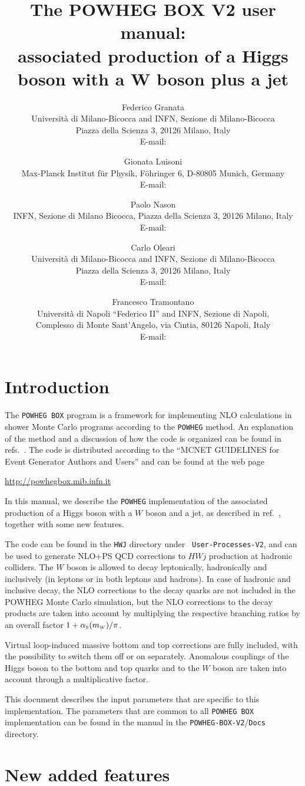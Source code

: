 \documentclass[paper]{JHEP3}
\title{The POWHEG BOX V2 user manual:\\
  associated production of a Higgs boson with a $\boldsymbol{W}$ boson plus a jet} \vfill
\author{Federico Granata\\
  Universit\`a di Milano-Bicocca and INFN, Sezione di Milano-Bicocca\\
  Piazza della Scienza 3, 20126 Milano, Italy\\
  E-mail: \email{federico.granata@mib.infn.it}}
\author{Gionata Luisoni\\ 
  Max-Planck Institut f{\"u}r Physik, F\"ohringer 6, D-80805 Munich, Germany\\
  E-mail: \email{luisonig@mpp.mpg.de}
}
\author{Paolo Nason\\
  INFN, Sezione di Milano Bicocca, Piazza della Scienza 3, 20126 Milano, Italy\\
  E-mail: \email{paolo.nason@mib.infn.it}
}
\author{Carlo Oleari\\
  Universit\`a di Milano-Bicocca and INFN, Sezione di Milano-Bicocca\\
  Piazza della Scienza 3, 20126 Milano, Italy\\
  E-mail: \email{carlo.oleari@mib.infn.it}}
\author{Francesco Tramontano\\
  Universit\`a di Napoli ``Federico II'' and INFN, Sezione di Napoli,\\
  Complesso di Monte Sant'Angelo, via Cintia, 80126 Napoli, Italy\\
  E-mail: \email{francesco.tramontano@na.infn.it}
}
\newcommand\sss{\mathchoice%
{\displaystyle}%
{\scriptstyle}%
{\scriptscriptstyle}%
{\scriptscriptstyle}%
}
\newcommand\as{\alpha_{\sss\rm S}}
\newcommand\POWHEG{{\tt POWHEG}}
\newcommand\POWHEGBOX{{\tt POWHEG BOX}}
\newcommand\POWHEGBOXV{{\tt POWHEG-BOX-V2}}
\newcommand\HWJ{{\tt HWJ}}
\begin{document}
\section{Introduction}

The \POWHEGBOX{} program is a framework for implementing NLO calculations in
shower Monte Carlo programs according to the \POWHEG{} method. An explanation
of the method and a discussion of how the code is organized can be found in
refs.~\cite{Nason:2004rx,Frixione:2007vw,Alioli:2010xd}.  The code is
distributed according to the ``MCNET GUIDELINES for Event Generator Authors
and Users'' and can be found at the web page
%
\begin{center}
 \url{http://powhegbox.mib.infn.it}
\end{center}
%
In this manual, we describe the \POWHEG{} implementation of the
associated production of a Higgs boson with a $W$ boson and a jet, as
described in ref.~\cite{Luisoni:2013cuh}, together with some new
features.

The code can be found in the \HWJ{} directory under {\tt
  User-Processes-V2}, and can be used to generate NLO+PS QCD
corrections to $HWj$ production at hadronic colliders.  The $W$ boson
is allowed to decay leptonically, hadronically and inclusively (in
leptons or in both leptons and hadrons).  In case of hadronic and
inclusive decay, the NLO corrections to the decay quarks are not
included in the POWHEG Monte Carlo simulation, but the NLO corrections
to the decay products are taken into account by multiplying the
respective branching ratios by an overall factor $1+\as(m_{\sss
  W})/\pi$.

Virtual loop-induced massive bottom and top corrections are fully included,
with the possibility to switch them off or on separately.  Anomalous
couplings of the Higgs boson to the bottom and top quarks and to the $W$
boson are taken into account through a multiplicative factor.

This document describes the input parameters that are specific to this
implementation. The parameters that are common to all \POWHEGBOX{}
implementation can be found in the manual in the \POWHEGBOXV{}/{\tt Docs}
directory.




\section{New added features}
\end{document}
